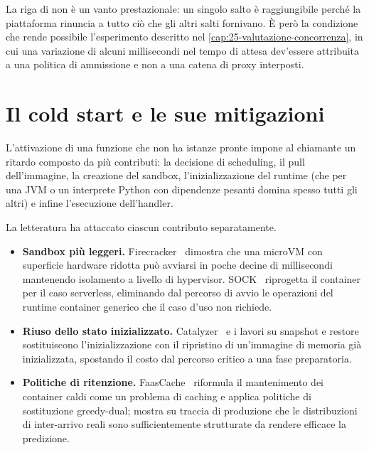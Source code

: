 La riga di \nf{} non \`e un vanto prestazionale: un singolo salto \`e
raggiungibile perch\'e la piattaforma rinuncia a tutto ci\`o che gli altri salti
fornivano. \`E per\`o la condizione che rende possibile l'esperimento descritto
nel \cref{cap:25-valutazione-concorrenza}, in cui una variazione di alcuni
millisecondi nel tempo di attesa dev'essere attribuita a una politica di
ammissione e non a una catena di proxy interposti.

\section{Il cold start e le sue mitigazioni}

L'attivazione di una funzione che non ha istanze pronte impone al chiamante un
ritardo composto da pi\`u contributi: la decisione di scheduling, il pull
dell'immagine, la creazione del sandbox, l'inizializzazione del runtime (che per
una JVM o un interprete Python con dipendenze pesanti domina spesso tutti gli
altri) e infine l'esecuzione dell'handler.

La letteratura ha attaccato ciascun contributo separatamente.

\begin{itemize}[leftmargin=*]
  \item \textbf{Sandbox pi\`u leggeri.} Firecracker~\cite{agache2020firecracker}
  dimostra che una microVM con superficie hardware ridotta pu\`o avviarsi in
  poche decine di millisecondi mantenendo isolamento a livello di hypervisor.
  SOCK~\cite{oakes2018sock} riprogetta il container per il caso serverless,
  eliminando dal percorso di avvio le operazioni del runtime container generico
  che il caso d'uso non richiede.

  \item \textbf{Riuso dello stato inizializzato.}
  Catalyzer~\cite{du2020catalyzer} e i lavori su snapshot e
  restore~\cite{ustiugov2021snapshots} sostituiscono l'inizializzazione con il
  ripristino di un'immagine di memoria gi\`a inizializzata, spostando il costo
  dal percorso critico a una fase preparatoria.

  \item \textbf{Politiche di ritenzione.} FaasCache~\cite{fuerst2021faascache}
  riformula il mantenimento dei container caldi come un problema di caching e
  applica politiche di sostituzione greedy-dual; \cite{shahrad2020wild} mostra su
  traccia di produzione che le distribuzioni di inter-arrivo reali sono
  sufficientemente strutturate da rendere efficace la predizione.
\end{itemize}

